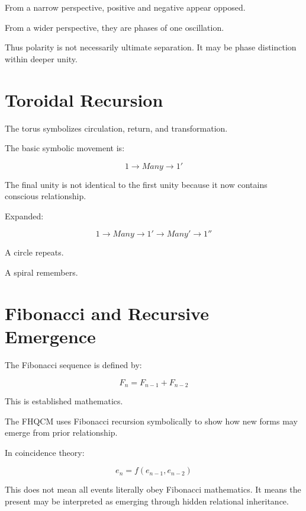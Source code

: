 From a narrow perspective, positive and negative appear opposed.

From a wider perspective, they are phases of one oscillation.

Thus polarity is not necessarily ultimate separation. It may be phase distinction within deeper unity.


\section{Toroidal Recursion}

The torus symbolizes circulation, return, and transformation.

The basic symbolic movement is:

\[
1 \rightarrow Many \rightarrow 1'
\]

The final unity is not identical to the first unity because it now contains conscious relationship.

Expanded:

\[
1 \rightarrow Many \rightarrow 1' \rightarrow Many' \rightarrow 1''
\]

A circle repeats.

A spiral remembers.


\section{Fibonacci and Recursive Emergence}

The Fibonacci sequence is defined by:

\[
F_n = F_{n-1}+F_{n-2}
\]

This is established mathematics.

The FHQCM uses Fibonacci recursion symbolically to show how new forms may emerge from prior relationship.

In coincidence theory:

\[
e_n = f(e_{n-1},e_{n-2})
\]

This does not mean all events literally obey Fibonacci mathematics. It means the present may be interpreted as emerging through hidden relational inheritance.

